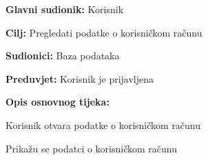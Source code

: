 \noindent {}
\begin{packed_item}
	
	\item \textbf{Glavni sudionik:} Korisnik
	\item \textbf{Cilj:} Pregledati podatke o korisničkom računu
	\item \textbf{Sudionici:} Baza podataka
	\item \textbf{Preduvjet:} Korisnik je prijavljena
	\item \textbf{Opis osnovnog tijeka:}
	
	\item[] \begin{packed_enum}
		
		\item Korisnik otvara podatke o korisničkom računu
		\item Prikažu se podatci o korisničkom računu
	
	\end{packed_enum}
	
\end{packed_item}

